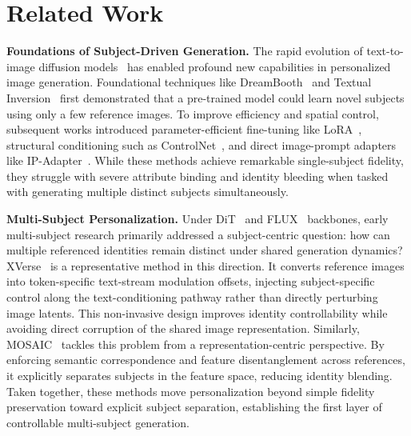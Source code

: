 \section{Related Work}

\textbf{Foundations of Subject-Driven Generation.} 
The rapid evolution of text-to-image diffusion models~\cite{rombach2022high} has enabled profound new capabilities in personalized image generation. Foundational techniques like DreamBooth~\cite{ruiz2023dreambooth} and Textual Inversion~\cite{gal2022image} first demonstrated that a pre-trained model could learn novel subjects using only a few reference images. To improve efficiency and spatial control, subsequent works introduced parameter-efficient fine-tuning like LoRA~\cite{hu2021lora}, structural conditioning such as ControlNet~\cite{zhang2023adding}, and direct image-prompt adapters like IP-Adapter~\cite{ye2023ip}. While these methods achieve remarkable single-subject fidelity, they struggle with severe attribute binding and identity bleeding when tasked with generating multiple distinct subjects simultaneously.

\textbf{Multi-Subject Personalization.} 
Under DiT~\cite{peebles2023scalable} and FLUX~\cite{labs2025flux1kontextflowmatching} backbones, early multi-subject research primarily addressed a subject-centric question: how can multiple referenced identities remain distinct under shared generation dynamics? XVerse~\cite{xverse2024} is a representative method in this direction. It converts reference images into token-specific text-stream modulation offsets, injecting subject-specific control along the text-conditioning pathway rather than directly perturbing image latents. This non-invasive design improves identity controllability while avoiding direct corruption of the shared image representation. Similarly, MOSAIC~\cite{mosaic2024} tackles this problem from a representation-centric perspective. By enforcing semantic correspondence and feature disentanglement across references, it explicitly separates subjects in the feature space, reducing identity blending. Taken together, these methods move personalization beyond simple fidelity preservation toward explicit subject separation, establishing the first layer of controllable multi-subject generation.

